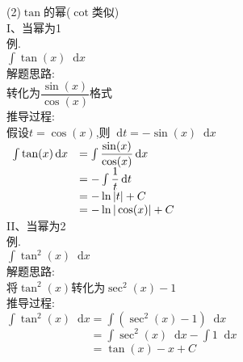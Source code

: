 \documentclass[UTF8, fontset=ubuntu, fleqn, fleqn]{ctexart}
\newcommand*{\dif}{\mathop{}\!\mathrm{d}}
\begin{document}
(2)$\tan$的幂($\cot$类似)\\
I、当幂为1\\
例.\\
$\int\tan(x)\dif x$\\
解题思路:\\
转化为$\dfrac{\sin(x)}{\cos(x)}$格式\\
推导过程:\\
假设$t=\cos(x)$,则$\dif t=-\sin(x)\dif x$\\
$\begin{array}{r l}
\int\tan(x)\dif x & =\int\dfrac{\sin(x)}{\cos(x)}\dif x\\
& =-\int\dfrac{1}{t}\dif t\\
& =-\ln|t|+C\\
& =-\ln|\cos(x)|+C
\end{array}$\\[2ex]

II、当幂为2\\
例.\\
$\int\tan^2(x)\dif x$\\
解题思路:\\
将$\tan^2(x)$转化为$\sec^2(x)-1$\\
推导过程:\\
$\int\tan^2(x)\dif x=\int(\sec^2(x)-1)\dif x$\\
$\phantom{\int\tan^2(x)\dif x}=\int\sec^2(x)\dif x-\int 1\dif x$\\
$\phantom{\int\tan^2(x)\dif x}=\tan(x)-x+C$\\[2ex]
\end{document}
